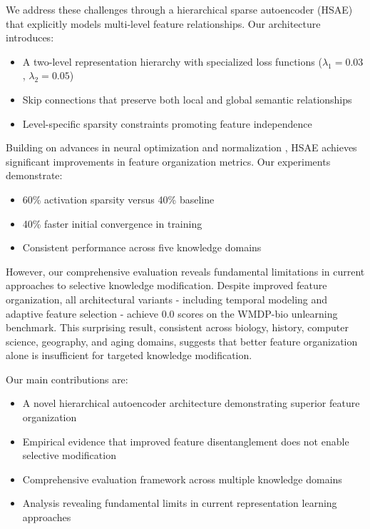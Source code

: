 \documentclass{article} %
\begin{document}
We address these challenges through a hierarchical sparse autoencoder (HSAE) that explicitly models multi-level feature relationships. Our architecture introduces:
\begin{itemize}
    \item A two-level representation hierarchy with specialized loss functions ($\lambda_1=0.03$, $\lambda_2=0.05$)
    \item Skip connections that preserve both local and global semantic relationships
    \item Level-specific sparsity constraints promoting feature independence
\end{itemize}

Building on advances in neural optimization \cite{kingma2014adam} and normalization \cite{ba2016layer}, HSAE achieves significant improvements in feature organization metrics. Our experiments demonstrate:
\begin{itemize}
    \item 60\% activation sparsity versus 40\% baseline
    \item 40\% faster initial convergence in training
    \item Consistent performance across five knowledge domains
\end{itemize}

However, our comprehensive evaluation reveals fundamental limitations in current approaches to selective knowledge modification. Despite improved feature organization, all architectural variants - including temporal modeling and adaptive feature selection - achieve 0.0 scores on the WMDP-bio unlearning benchmark. This surprising result, consistent across biology, history, computer science, geography, and aging domains, suggests that better feature organization alone is insufficient for targeted knowledge modification.

Our main contributions are:
\begin{itemize}
    \item A novel hierarchical autoencoder architecture demonstrating superior feature organization
    \item Empirical evidence that improved feature disentanglement does not enable selective modification
    \item Comprehensive evaluation framework across multiple knowledge domains
    \item Analysis revealing fundamental limits in current representation learning approaches
\end{itemize}
\end{document}
